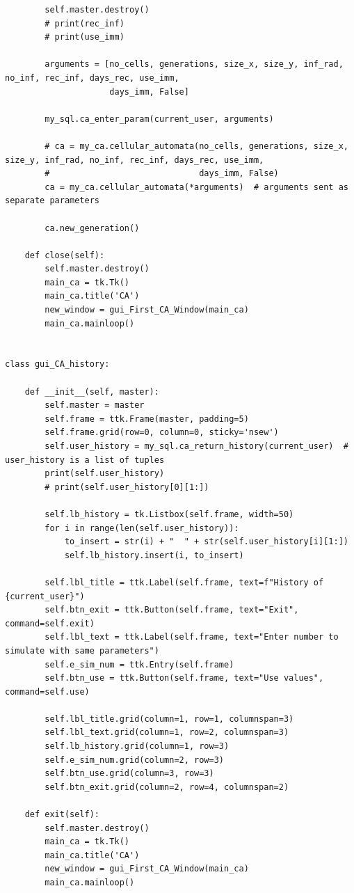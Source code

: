 \documentclass[11pt, a4paper]{article}
\begin{document}
\begin{lstlisting}
        self.master.destroy()
        # print(rec_inf)
        # print(use_imm)

        arguments = [no_cells, generations, size_x, size_y, inf_rad, no_inf, rec_inf, days_rec, use_imm,
                     days_imm, False]

        my_sql.ca_enter_param(current_user, arguments)

        # ca = my_ca.cellular_automata(no_cells, generations, size_x, size_y, inf_rad, no_inf, rec_inf, days_rec, use_imm,
        #                              days_imm, False)
        ca = my_ca.cellular_automata(*arguments)  # arguments sent as separate parameters

        ca.new_generation()

    def close(self):
        self.master.destroy()
        main_ca = tk.Tk()
        main_ca.title('CA')
        new_window = gui_First_CA_Window(main_ca)
        main_ca.mainloop()


class gui_CA_history:

    def __init__(self, master):
        self.master = master
        self.frame = ttk.Frame(master, padding=5)
        self.frame.grid(row=0, column=0, sticky='nsew')
        self.user_history = my_sql.ca_return_history(current_user)  # user_history is a list of tuples
        print(self.user_history)
        # print(self.user_history[0][1:])

        self.lb_history = tk.Listbox(self.frame, width=50)
        for i in range(len(self.user_history)):
            to_insert = str(i) + "  " + str(self.user_history[i][1:])
            self.lb_history.insert(i, to_insert)

        self.lbl_title = ttk.Label(self.frame, text=f"History of {current_user}")
        self.btn_exit = ttk.Button(self.frame, text="Exit", command=self.exit)
        self.lbl_text = ttk.Label(self.frame, text="Enter number to simulate with same parameters")
        self.e_sim_num = ttk.Entry(self.frame)
        self.btn_use = ttk.Button(self.frame, text="Use values", command=self.use)

        self.lbl_title.grid(column=1, row=1, columnspan=3)
        self.lbl_text.grid(column=1, row=2, columnspan=3)
        self.lb_history.grid(column=1, row=3)
        self.e_sim_num.grid(column=2, row=3)
        self.btn_use.grid(column=3, row=3)
        self.btn_exit.grid(column=2, row=4, columnspan=2)

    def exit(self):
        self.master.destroy()
        main_ca = tk.Tk()
        main_ca.title('CA')
        new_window = gui_First_CA_Window(main_ca)
        main_ca.mainloop()


\end{lstlisting}
\end{document}
